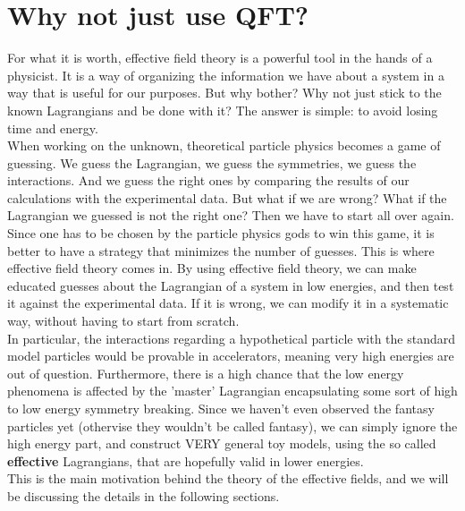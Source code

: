 
\chapter{Why not just use QFT?}
For what it is worth, effective field theory is a powerful tool in the hands of a physicist. It is a way of organizing the information we have about a system in a way that is useful for our purposes. But why bother? Why not just stick to the known Lagrangians and be done with it? The answer is simple: to avoid losing time and energy.\\
When working on the unknown, theoretical particle physics becomes a game of guessing. We guess the Lagrangian, we guess the symmetries, we guess the interactions. And we guess the right ones by comparing the results of our calculations with the experimental data. But what if we are wrong? What if the Lagrangian we guessed is not the right one? Then we have to start all over again.\\
Since one has to be chosen by the particle physics gods to win this game, it is better to have a strategy that minimizes the number of guesses. This is where effective field theory comes in. By using effective field theory, we can make educated guesses about the Lagrangian of a system in low energies, and then test it against the experimental data. If it is wrong, we can modify it in a systematic way, without having to start from scratch.\\
In particular, the interactions regarding a hypothetical particle with the standard model particles would be provable in accelerators, meaning very high energies are out of question. Furthermore, there is a high chance that the low energy phenomena is affected by the 'master' Lagrangian encapsulating some sort of high to low energy symmetry breaking. Since we haven't even observed the fantasy particles yet (othervise they wouldn't be called fantasy), we can simply ignore the high energy part, and construct VERY general toy models, using the so called \textbf{effective} Lagrangians, that are hopefully valid in lower energies.\\
This is the main motivation behind the theory of the effective fields, and we will be discussing the details in the following sections.